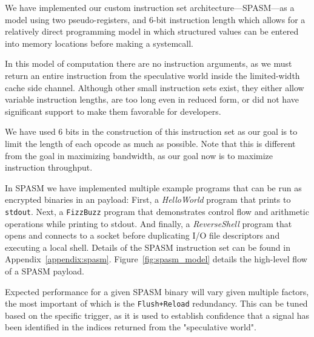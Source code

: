 We have implemented our custom instruction set architecture---SPASM---as a model
using two pseudo-registers, and
6-bit instruction length which allows for a relatively direct programming model
in which structured values can be entered into memory locations before making
a systemcall.


%

In this model of computation there are no instruction arguments, as we must
return an entire instruction from the speculative world inside the limited-width
cache side channel. Although other small
instruction sets exist, they either allow variable instruction
lengths, are too long even in reduced form, or did not have significant support
to make them favorable for developers.

We have used 6 bits in the construction of this instruction set as our
goal is to limit the length of each opcode as much as possible. Note that this
is different from the goal in maximizing bandwidth, as our goal now is to
maximize instruction throughput.

In SPASM we have implemented multiple example programs that can be run as
encrypted binaries in an \speculake payload: First, a \textit{HelloWorld}
program that prints to \texttt{stdout}. Next, a \texttt{FizzBuzz} program that
demonstrates control flow and arithmetic operations while printing to stdout.
And finally, a \textit{ReverseShell} program that opens and connects to a socket
before  duplicating I/O file descriptors and executing a local shell. Details of
the SPASM instruction set can be found in Appendix~\ref{appendix:spasm}. Figure~\ref{fig:spasm_model} details the high-level flow of a SPASM payload.

Expected performance for a given SPASM binary will vary given multiple factors,
the most important of which is the \texttt{Flush+Reload} redundancy. This can be
tuned based on the specific trigger, as it is used to establish confidence that
a signal has been identified in the indices returned from the "speculative
world". 


